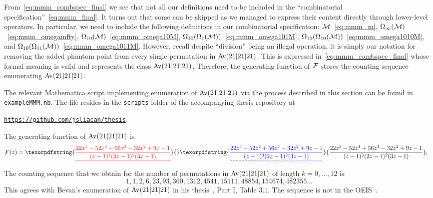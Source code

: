 \documentclass[12pt, a4paper, twoside]{report}
\providecommand{\DIFaddtex}[1]{{\protect\color{blue}\uwave{#1}}} %
\providecommand{\DIFdeltex}[1]{{\protect\color{red}\sout{#1}}}                      %
\providecommand{\DIFaddbegin}{} %
\providecommand{\DIFaddend}{} %
\providecommand{\DIFdelbegin}{} %
\providecommand{\DIFdelend}{} %
\providecommand{\DIFadd}[1]{\texorpdfstring{\DIFaddtex{#1}}{#1}} %
\providecommand{\DIFdel}[1]{\texorpdfstring{\DIFdeltex{#1}}{}} %
\begin{document}
From~\eqref{eq:mmm_combspec_final} we see that not all our definitions need to be included in the ``combinatorial specification''~\eqref{eq:mmm_final}. It turns out that some can be skipped as we managed to express their content directly through lower-level operators. In particular, we need to include the following definitions in our combinatorial specification: $\mathcal{M}$~\eqref{eq:mmm_m}, $\Omega_\infty(\mathcal{M})$~\eqref{eq:mmm_omegainfty}, $\Omega_{10}(\mathcal{M})$~\eqref{eq:mmm_omega10M}, $\Omega_{10}(\Omega_1(\mathcal{M}))$~\eqref{eq:mmm_omega101M}, $\Omega_{10}(\Omega_{10}(\mathcal{M}))$~\eqref{eq:mmm_omega1010M}, and $\Omega_{10}(\Omega_{11}(\mathcal{M}))$~\eqref{eq:mmm_omega1011M}. However, recall despite ``division'' being an illegal operation, it is simply our notation for removing the added phantom point from every single permutation in $\mathrm{Av}(21|21|21)$. This is expressed in~\eqref{eq:mmm_combspec_final} whose formal meaning is valid and represents the class $\mathrm{Av}(21|21|21)$. Therefore, the generating function of $\mathcal{F}$ stores the counting sequence enumerating $\mathrm{Av}(21|21|21)$.

The relevant Mathematica script implementing enumeration of $\mathrm{Av}(21|21|21)$ via the process described in this section can be found in \texttt{exampleMMM.nb}. The file resides in the \texttt{scripts} folder of the accompanying thesis repository at

\begin{center}\href{https://github.com/jsliacan/thesis}{\texttt{https://github.com/jsliacan/thesis}}.\end{center}

The generating function of $\mathrm{Av}(21|21|21)$ is
\begin{align}
  F(z) &= \DIFdelbegin \DIFdel{\frac{22x^5-52x^4+56x^3-32x^2+9x-1}{(x-1)^3(2x-1)^2(3x-1)}}\DIFdelend \DIFaddbegin \DIFadd{\frac{22z^5-52z^4+56z^3-32z^2+9z-1}{(z-1)^3(2z-1)^2(3z-1)}}\DIFaddend .
\end{align}
The counting sequence that we obtain for the number of permutations in $\mathrm{Av}(21|21|21)$ of length $k=0,\ldots,12$ is $$1, 1, 2, 6, 23, 93, 360, 1312, 4541, 15111, 48854, 154674, 482355\ldots$$
This agrees with Bevan's enumeration of $\mathrm{Av}(21|21|21)$ in his thesis~\cite{bevan2015thesis}, Part I, Table 3.1. The sequence is not in the OEIS~\cite{oeis}.
\end{document}
